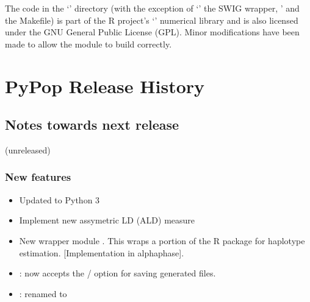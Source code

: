 \documentclass[letterpaper,10pt,english,openany,oneside]{sphinxmanual}
\begin{document}
\begin{description}
\sphinxAtStartPar
The code in the ‘’ directory (with the exception of
‘’ the SWIG wrapper, ’ and the Makefile) is
part of the R project’s ‘’ numerical library
 and is also licensed under the GNU General
Public License (GPL). Minor modifications have been made to allow the
module to build correctly.

\end{description}


\section{PyPop Release History}
\label{\detokenize{docs/guide-chapter-changes:pypop-release-history}}

\subsection{Notes towards next release}
\label{\detokenize{docs/guide-chapter-changes:notes-towards-next-release}}\label{\detokenize{docs/guide-chapter-changes:news-start}}
\sphinxAtStartPar
(unreleased)


\subsubsection{New features}
\label{\detokenize{docs/guide-chapter-changes:new-features}}\begin{itemize}
\item {} 
\sphinxAtStartPar
Updated to Python 3

\item {} 
\sphinxAtStartPar
Implement new assymetric LD (ALD) measure

\item {} 
\sphinxAtStartPar
New wrapper module . This wraps a portion of the
 R package  for haplotype
estimation. {[}Implementation in alpha\sphinxhyphen{}phase{]}.

\item {} 
\sphinxAtStartPar
{}: now accepts the / option for saving
generated files.

\item {} 
\sphinxAtStartPar
{}: renamed  to 

\end{itemize}
\end{document}

